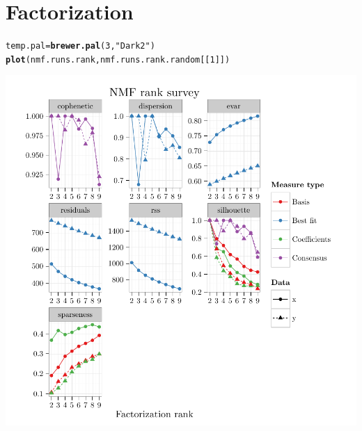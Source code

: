 \documentclass{article}\usepackage[]{graphicx}\usepackage[]{color}
\makeatletter
\def\maxwidth{ %
  \ifdim\Gin@nat@width>\linewidth
    \linewidth
  \else
    \Gin@nat@width
  \fi
}
\newcommand{\hlnum}[1]{\textcolor[rgb]{0.686,0.059,0.569}{#1}}%
\newcommand{\hlstr}[1]{\textcolor[rgb]{0.192,0.494,0.8}{#1}}%
\newcommand{\hlstd}[1]{\textcolor[rgb]{0.345,0.345,0.345}{#1}}%
\newcommand{\hlkwb}[1]{\textcolor[rgb]{0.69,0.353,0.396}{#1}}%
\newcommand{\hlkwd}[1]{\textcolor[rgb]{0.737,0.353,0.396}{\textbf{#1}}}%
\newenvironment{kframe}{%
 \def\at@end@of@kframe{}%
 \ifinner\ifhmode%
  \def\at@end@of@kframe{\end{minipage}}%
  \begin{minipage}{\columnwidth}%
 \fi\fi%
 \def\FrameCommand##1{\hskip\@totalleftmargin \hskip-\fboxsep
 \colorbox{shadecolor}{##1}\hskip-\fboxsep
     \hskip-\linewidth \hskip-\@totalleftmargin \hskip\columnwidth}%
 \MakeFramed {\advance\hsize-\width
   \@totalleftmargin\z@ \linewidth\hsize
   \@setminipage}}%
 {\par\unskip\endMakeFramed%
 \at@end@of@kframe}
\newenvironment{knitrout}{}{} %
\makeatother
\begin{document}
\section{Factorization}
\begin{knitrout}
\color{fgcolor}\begin{kframe}
\begin{alltt}
\hlstd{temp.pal} \hlkwb{=} \hlkwd{brewer.pal}\hlstd{(}\hlnum{3}\hlstd{,} \hlstr{"Dark2"}\hlstd{)}
\hlkwd{plot}\hlstd{(nmf.runs.rank, nmf.runs.rank.random[[}\hlnum{1}\hlstd{]])}
\end{alltt}
\end{kframe}

{\centering \includegraphics[width=\maxwidth]{figure/nmf-rank-plots-1} 

}



\end{knitrout}
\end{document}
